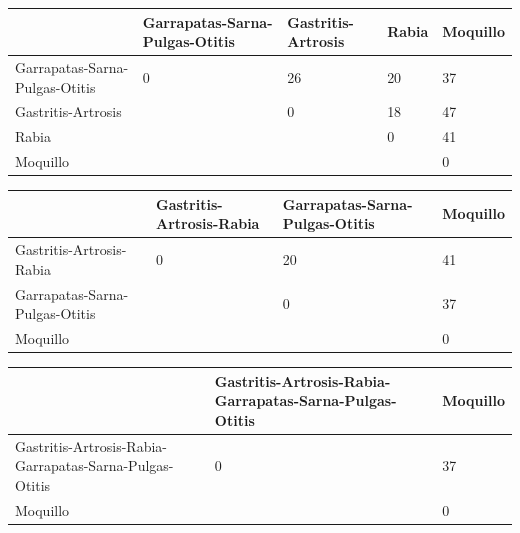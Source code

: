 \documentclass[a4paper,table,xcdraw]{article}
\begin{document}
\begin{longtable}{|l|l|l|l|l|}
\hline
                               & Garrapatas-Sarna-Pulgas-Otitis & Gastritis-Artrosis & Rabia & Moquillo \\ \hline
\endhead
%
Garrapatas-Sarna-Pulgas-Otitis & 0                              & 26                 & 20    & 37       \\ \hline
Gastritis-Artrosis             &                                & 0                  & 18    & 47       \\ \hline
Rabia                          &                                &                    & 0     & 41       \\ \hline
Moquillo                       &                                &                    &       & 0        \\ \hline
\end{longtable}

\begin{longtable}{|l|l|l|l|}
\hline
                               & Gastritis-Artrosis-Rabia & Garrapatas-Sarna-Pulgas-Otitis & Moquillo \\ \hline
\endhead
%
Gastritis-Artrosis-Rabia       & 0                        & 20                             & 41       \\ \hline
Garrapatas-Sarna-Pulgas-Otitis &                          & 0                              & 37       \\ \hline
Moquillo                       &                          &                                & 0        \\ \hline
\end{longtable}

\begin{longtable}{|m{200pt} | m{200pt} | m{50pt} |}
\hline
                                                        & Gastritis-Artrosis-Rabia-Garrapatas-Sarna-Pulgas-Otitis & Moquillo \\ \hline
\endhead
%
Gastritis-Artrosis-Rabia-Garrapatas-Sarna-Pulgas-Otitis & 0                                                       & 37       \\ \hline
Moquillo                                                &                                                         & 0        \\ \hline
\end{longtable}
\end{document}
